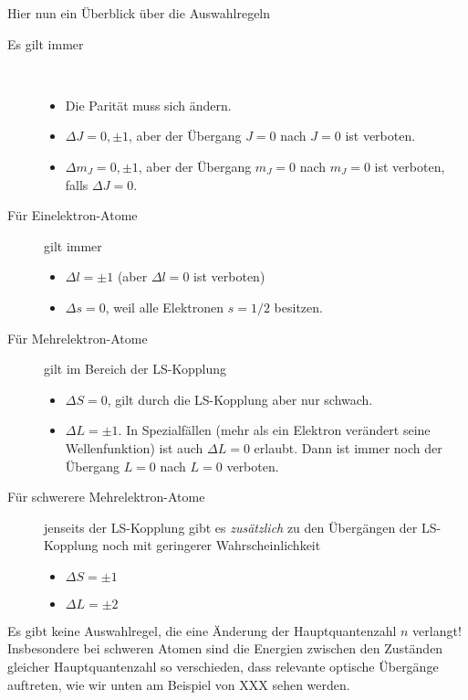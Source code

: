 Hier nun ein Überblick über die Auswahlregeln
\begin{description}
    \item[Es gilt immer] \ \\
\begin{itemize}\setlength{\itemsep}{0pt}
    \item Die Parität muss sich ändern.
    \item $\Delta J = 0, \pm 1$, aber der Übergang $J=0$ nach $J=0$ ist verboten.
    \item $\Delta m_J = 0, \pm 1$, aber der Übergang $m_J=0$ nach $m_J=0$ ist verboten, falls $\Delta J = 0$.
\end{itemize}

\item[Für Einelektron-Atome]  gilt immer  \ \\
\begin{itemize}\setlength{\itemsep}{0pt}
    \item  $\Delta l = \pm 1$ (aber  $\Delta l = 0$ ist verboten)
    \item $\Delta s = 0$, weil alle Elektronen $s=1/2$ besitzen.
\end{itemize}

\item[Für Mehrelektron-Atome] gilt im Bereich der LS-Kopplung   \ \\  
\begin{itemize}\setlength{\itemsep}{0pt}
    \item $\Delta S = 0$, gilt durch die LS-Kopplung aber nur schwach.
    \item $\Delta L = \pm 1$. In Spezialfällen (mehr als ein Elektron verändert seine Wellenfunktion) ist auch $\Delta L = 0$ erlaubt. Dann ist immer noch der Übergang $L=0$ nach $L=0$  verboten.
\end{itemize}

\item[Für schwerere Mehrelektron-Atome]  jenseits  der LS-Kopplung gibt es \emph{zusätzlich} zu den Übergängen der LS-Kopplung noch mit geringerer Wahrscheinlichkeit    
\begin{itemize}\setlength{\itemsep}{0pt}
    \item $\Delta S  = \pm 1$
    \item $\Delta L =  \pm 2$ 
\end{itemize}
\end{description}

Es gibt keine Auswahlregel, die eine Änderung der Hauptquantenzahl $n$ verlangt! Insbesondere bei schweren Atomen sind die Energien zwischen den Zuständen gleicher Hauptquantenzahl so verschieden, dass relevante optische Übergänge auftreten, wie wir unten am Beispiel von XXX sehen werden.

